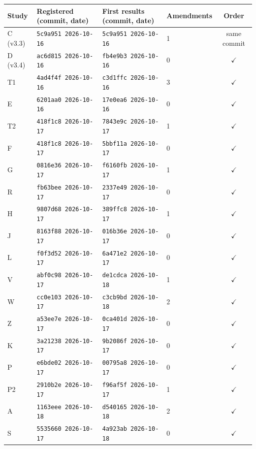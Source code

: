 \begin{tabular}{llllc}
\toprule
Study & Registered (commit, date) & First results (commit, date) & Amendments & Order \\
\midrule
C (v3.3) & \texttt{5c9a951 2026-10-16} & \texttt{5c9a951 2026-10-16} & 1 & same commit \\
D (v3.4) & \texttt{ac6d815 2026-10-16} & \texttt{fb4e9b3 2026-10-16} & 0 & $\checkmark$ \\
T1 & \texttt{4ad4f4f 2026-10-16} & \texttt{c3d1ffc 2026-10-16} & 3 & $\checkmark$ \\
E & \texttt{6201aa0 2026-10-16} & \texttt{17e0ea6 2026-10-16} & 0 & $\checkmark$ \\
T2 & \texttt{418f1c8 2026-10-17} & \texttt{7843e9c 2026-10-17} & 1 & $\checkmark$ \\
F & \texttt{418f1c8 2026-10-17} & \texttt{5bbf11a 2026-10-17} & 0 & $\checkmark$ \\
G & \texttt{0816e36 2026-10-17} & \texttt{f6160fb 2026-10-17} & 1 & $\checkmark$ \\
R & \texttt{fb63bee 2026-10-17} & \texttt{2337e49 2026-10-17} & 0 & $\checkmark$ \\
H & \texttt{9807d68 2026-10-17} & \texttt{389ffc8 2026-10-17} & 1 & $\checkmark$ \\
J & \texttt{8163f88 2026-10-17} & \texttt{016b36e 2026-10-17} & 0 & $\checkmark$ \\
L & \texttt{f0f3d52 2026-10-17} & \texttt{6a471e2 2026-10-17} & 0 & $\checkmark$ \\
V & \texttt{abf0c98 2026-10-17} & \texttt{de1cdca 2026-10-18} & 1 & $\checkmark$ \\
W & \texttt{cc0e103 2026-10-17} & \texttt{c3cb9bd 2026-10-18} & 2 & $\checkmark$ \\
Z & \texttt{a53ee7e 2026-10-17} & \texttt{0ca401d 2026-10-17} & 0 & $\checkmark$ \\
K & \texttt{3a21238 2026-10-17} & \texttt{9b2086f 2026-10-17} & 0 & $\checkmark$ \\
P & \texttt{e6bde02 2026-10-17} & \texttt{00795a8 2026-10-17} & 0 & $\checkmark$ \\
P2 & \texttt{2910b2e 2026-10-17} & \texttt{f96af5f 2026-10-17} & 1 & $\checkmark$ \\
A & \texttt{1163eee 2026-10-18} & \texttt{d540165 2026-10-18} & 2 & $\checkmark$ \\
S & \texttt{5535660 2026-10-17} & \texttt{4a923ab 2026-10-18} & 0 & $\checkmark$ \\

\end{tabular}
